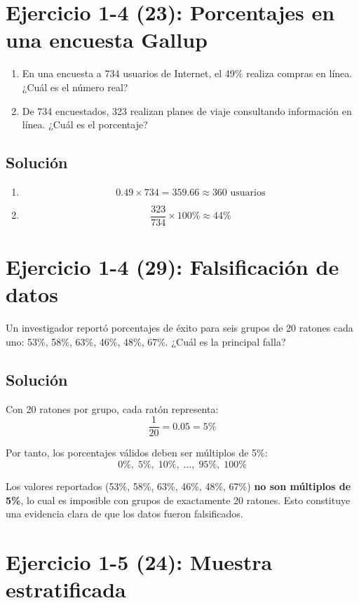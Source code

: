 \documentclass[a4paper]{article}
\begin{document}
\section{Ejercicio 1-4 (23): Porcentajes en una encuesta Gallup}

\begin{enumerate}
    \item[a)] En una encuesta a 734 usuarios de Internet, el 49\% realiza compras en línea. ¿Cuál es el número real?
    \item[b)] De 734 encuestados, 323 realizan planes de viaje consultando información en línea. ¿Cuál es el porcentaje?
\end{enumerate}

\subsection{Solución}

\begin{enumerate}
    \item[a)]
    $$0.49 \times 734 = 359.66 \approx 360 \text{ usuarios}$$

    \item[b)]
    $$\frac{323}{734} \times 100\% \approx 44\%$$
\end{enumerate}

\section{Ejercicio 1-4 (29): Falsificación de datos}

Un investigador reportó porcentajes de éxito para seis grupos de 20 ratones cada uno: 53\%, 58\%, 63\%, 46\%, 48\%, 67\%. ¿Cuál es la principal falla?

\subsection{Solución}

Con 20 ratones por grupo, cada ratón representa:
$$\frac{1}{20} = 0.05 = 5\%$$

Por tanto, los porcentajes válidos deben ser múltiplos de 5\%:
$$0\%,\; 5\%,\; 10\%,\; \ldots,\; 95\%,\; 100\%$$

Los valores reportados (53\%, 58\%, 63\%, 46\%, 48\%, 67\%) \textbf{no son múltiplos de 5\%}, lo cual es imposible con grupos de exactamente 20 ratones. Esto constituye una evidencia clara de que los datos fueron falsificados.

\section{Ejercicio 1-5 (24): Muestra estratificada}
\end{document}
